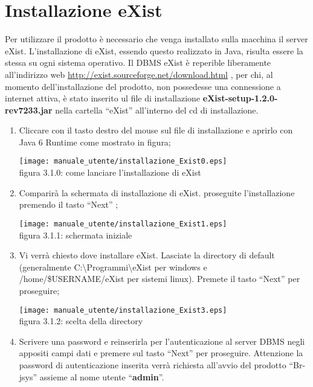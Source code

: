 \section{Installazione eXist}
Per utilizzare il prodotto \`e necessario che venga installato sulla macchina il server eXist. L'installazione di eXist, essendo questo realizzato in Java, risulta essere la stessa su ogni sistema operativo.
Il DBMS eXist \`e reperible liberamente all'indirizzo web \href{http://exist.sourceforge.net/download.html}{http://exist.sourceforge.net/download.html} , per chi, al momento dell'installazione del prodotto, non possedesse una connessione a internet attiva, \`e stato inserito ul file di installazione \textbf{eXist-setup-1.2.0-rev7233.jar} nella cartella ``eXist'' all'interno del cd di installazione.
\begin{enumerate}
\item Cliccare con il tasto destro del mouse sul file di installazione e aprirlo con Java 6 Runtime come mostrato in figura;
\begin{center}
\texttt{[image: manuale\_utente/installazione\_Exist0.eps]}\\
 figura 3.1.0: come lanciare l'installazione di eXist
\end{center}
\item Comparir\`a la schermata di installazione di eXist. proseguite l'installazione premendo il tasto ``Next'' ;
\begin{center}
\texttt{[image: manuale\_utente/installazione\_Exist1.eps]}\\
 figura 3.1.1: schermata iniziale
\end{center}
\item Vi verr\`a chiesto dove installare eXist. Lasciate la directory di default (generalmente C:\textbackslash Programmi\textbackslash eXist per windows e  /home/\$USERNAME/eXist per sistemi linux). Premete il tasto ``Next'' per proseguire;
\begin{center}
\texttt{[image: manuale\_utente/installazione\_Exist3.eps]}\\
 figura 3.1.2: scelta della directory
\end{center}
\item Scrivere  una password e reinserirla per l'autenticazione al server DBMS negli appositi campi dati e premere sul tasto ``Next'' per proseguire. Attenzione la password di autenticazione inserita verr\`a richiesta all'avvio del prodotto ``Br-jsys'' assieme al nome utente ``\textbf{admin}''.

\end{enumerate}

